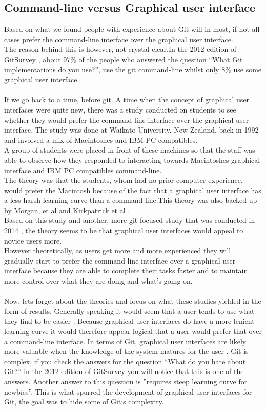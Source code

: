 \documentclass[12pt,a4paper,article,compsoc]{IEEEtran}
\begin{document}
			\subsection{Command-line versus Graphical user interface}
			Based on what we found people with experience about Git will in most, if not all cases prefer the command-line interface over the graphical user interface.\\
			The reason behind this is however, not crystal clear.In the 2012 edition of GitSurvey \cite{GitUserSurvey}, about 97\% of the people who answered the question “What Git implementations do you use?”, use the git command-line whilst only 8\% use some graphical user interface.\\\\
			If we go back to a time, before git. A time when the concept of graphical user interfaces were quite new, there was a study conducted on students to see whether they would prefer the command-line interface over the graphical user interface. The study was done at Waikato University, New Zealand, back in 1992 and involved a mix of Macintoshes and IBM PC compatibles.\\
			A group of students were placed in front of these machines so that the staff was able to observe how they responded to interacting towards Macintoshes graphical interface and IBM PC compatibles command-line.\\
			The theory was that the students, whom had no prior computer experience, would prefer the Macintosh because of the fact that a graphical user interface has a less harsh learning curve than a command-line.This theory was also backed up by Morgan, et al \cite{MouseToRat} and Kirkpatrick et al \cite{MacVsWindows}.\\
			Based on this study and another, more git-focused study that was conducted in 2014 \cite{GitInClassroom}, the theory seems to be that graphical user interfaces would appeal to novice users more.\\
			However theoretically, as users get more and more experienced they will gradually start to prefer the command-line interface over a graphical user interface because they are able to complete their tasks faster and to maintain more control over what they are doing and what's going on.\\\\
			Now, lets forget about the theories and focus on what these studies yielded in the form of results. Generally speaking it would seem that a user tends to use what they find to be easier \cite{Treweek}. Because graphical user interfaces do have a more lenient learning curve it would therefore appear logical that a user would prefer that over a command-line interface. In terms of Git, graphical user interfaces are likely more valuable when the knowledge of the system matures for the user \cite{GitInClassroom}. Git is complex, if you check the answers for the question “What do you hate about Git?” in the 2012 edition of GitSurvey you will notice that this is one of the answers. Another answer to this question is ”requires steep learning curve for newbies”. This is what spurred the development of graphical user interfaces for Git, the goal was to hide some of Git:s complexity. \cite{WrongWithGit}
			
\end{document}
